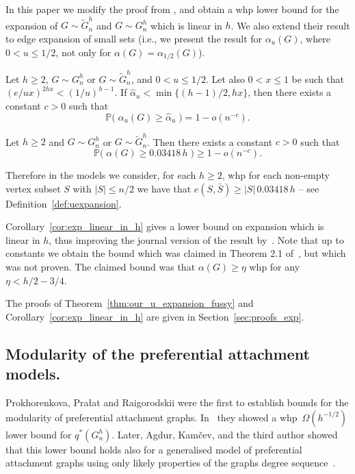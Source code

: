 \documentclass[runningheads, envcountsame, smallextended]{llncs}
\newcommand{\pr}{{\mathbb P}}
\newcommand{\q}{q^*}
\numberwithin{theorem}{section}
\numberwithin{definition}{section}
\numberwithin{lemma}{section}
\numberwithin{corollary}{section}
\numberwithin{proposition}{section}
\numberwithin{conjecture}{section}
\numberwithin{remark}{section}
\numberwithin{equation}{section}
\begin{document}
In this paper we modify the proof from \cite{mihail2006journal}, and obtain a whp lower bound for the expansion of $G \sim \tilde{G}_n^h$ and $G \sim G_n^h$ which is linear in $h$. We also extend their result to edge expansion of small sets (i.e., we present the result for $\alpha_u(G)$, where $0<u\leq 1/2$, not only for $\alpha(G) = \alpha_{1/2}(G)$).


\begin{theorem} \label{thm:our_u_expansion_fussy}
	Let $h\geq 2$, 
    $G\sim G_n^h$ or $G \sim \tilde{G}_n^h$, and $0 < u \leq 1/2$. Let also $0< x \leq 1$	be such that $(e/u x)^{2h x} < (1/u)^{h-1}$. If 
    $\hat{\alpha}_u < \min\{ (h-1)/2, hx\}$, then there exists a constant $c>0$ such that
	\[
	\pr\big(\;\alpha_u(G) \geq \hat{\alpha}_u \;\big) = 1 - o(n^{-c}).
	\]
\end{theorem}


\begin{corollary} \label{cor:exp_linear_in_h}
	Let $h \geq 2%
    $ and $G \sim G_n^h$ or $G \sim \tilde{G}_n^h$. Then there exists a constant $c>0$ such that 
	\[
	\pr\big(\;\alpha(G) \geq 0.03418 \, h \;\big) \geq 1-o(n^{-c}).
	\]
\end{corollary}
%
Therefore in the models we consider, for each $h\ge 2$, whp for each non-empty vertex subset $S$ with $|S|\le n/2$ we have that $e(S,\bar S)\ge |S|\,0.03418 \, h$ -- see Definition~\ref{def:uexpansion}.

Corollary~\ref{cor:exp_linear_in_h} gives a lower bound on expansion which is linear in $h$, thus improving the journal version of the result by~\cite{mihail2006journal}. Note that up to constants we obtain the bound which was claimed in Theorem 2.1 of~\cite{mihail2003conf}, 
but which was not proven. The claimed bound was that $\alpha(G)\geq \eta $ whp for any $\eta<h/2-3/4$.


The proofs of Theorem~\ref{thm:our_u_expansion_fussy} and Corollary~\ref{cor:exp_linear_in_h} are given in Section~\ref{sec:proofs_exp}.


\subsection{Modularity of the preferential attachment models.}\label{sec:modularity}

Prokhorenkova, Pra\l at and Raigorodskii were the first to establish 
bounds for the modularity of preferential attachment graphs. %
In~\cite{prokhorenkova2017modularity_internet_Math} they showed a whp~$\Omega(h^{-1/2})$ lower bound for $\q(G_n^h)$. 
Later, Agdur, Kam\v{c}ev, and the third author showed that this lower bound holds also for a generalised model of preferential attachment graphs using only likely properties of the graphs degree sequence~\cite{mod2023universal}.
\end{document}
